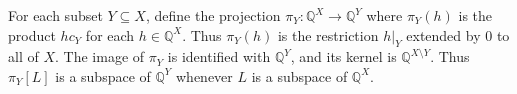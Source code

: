 For each subset $Y \subseteq X$, define the projection $\pi_Y: \mathbb{Q}^X \to \mathbb{Q}^Y$ where $\pi_Y(h)$ is the product $hc_Y$ for each $h \in \mathbb{Q}^X$. Thus $\pi_Y(h)$ is the restriction $h|_Y$ extended by $0$ to all of $X$. The image of $\pi_Y$ is identified with $\mathbb{Q}^Y$, and its kernel is $\mathbb{Q}^{X \setminus Y}$. Thus $\pi_Y[L]$ is a subspace of $\mathbb{Q}^Y$ whenever $L$ is a subspace of $\mathbb{Q}^X$.
